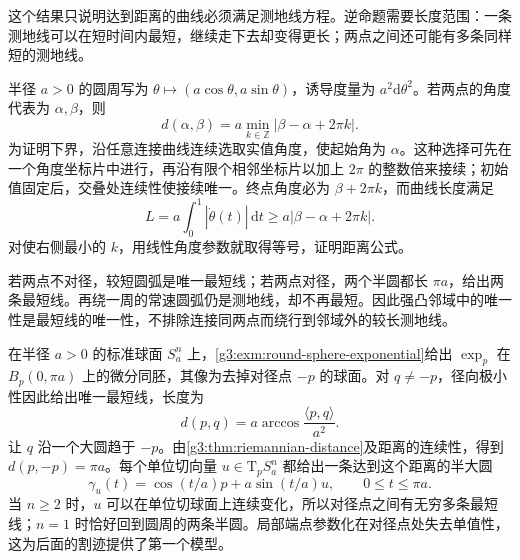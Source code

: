 这个结果只说明达到距离的曲线必须满足测地线方程。逆命题需要长度范围：一条测地线可以在短时间内最短，继续走下去却变得更长；两点之间还可能有多条同样短的测地线。

\begin{example}
	\label{g3:exm:circle-distance}
	半径 \(a>0\) 的圆周写为 \(\theta\mapsto(a\cos\theta,a\sin\theta)\)，诱导度量为 \(a^2\mathrm{d}\theta^2\)。若两点的角度代表为 \(\alpha,\beta\)，则
	\begin{equation}
		\label{g3:eq:circle-distance}
		d(\alpha,\beta)=a\min_{k\in\mathbb Z}|\beta-\alpha+2\pi k|.
	\end{equation}
	为证明下界，沿任意连接曲线连续选取实值角度，使起始角为 \(\alpha\)。这种选择可先在一个角度坐标片中进行，再沿有限个相邻坐标片以加上 \(2\pi\) 的整数倍来接续；初始值固定后，交叠处连续性使接续唯一。终点角度必为 \(\beta+2\pi k\)，而曲线长度满足
	\[
		L=a\int_0^1|\dot\theta(t)|\,\mathrm{d}t
		\geq a|\beta-\alpha+2\pi k|.
	\]
	对使右侧最小的 \(k\)，用线性角度参数就取得等号，证明距离公式。

	若两点不对径，较短圆弧是唯一最短线；若两点对径，两个半圆都长 \(\pi a\)，给出两条最短线。再绕一周的常速圆弧仍是测地线，却不再最短。因此强凸邻域中的唯一性是最短线的唯一性，不排除连接同两点而绕行到邻域外的较长测地线。
\end{example}

\begin{example}
	\label{g3:exm:sphere-multiple-minimizers}
	在半径 \(a>0\) 的标准球面 \(S_a^n\) 上，\cref{g3:exm:round-sphere-exponential}给出 \(\exp_p\) 在 \(B_p(0,\pi a)\) 上的微分同胚，其像为去掉对径点 \(-p\) 的球面。对 \(q\ne-p\)，径向极小性因此给出唯一最短线，长度为
	\[
		d(p,q)=a\arccos\frac{\langle p,q\rangle}{a^2}.
	\]
	让 \(q\) 沿一个大圆趋于 \(-p\)。由\cref{g3:thm:riemannian-distance}及距离的连续性，得到 \(d(p,-p)=\pi a\)。每个单位切向量 \(u\in\mathrm{T}_pS_a^n\) 都给出一条达到这个距离的半大圆
	\[
		\gamma_u(t)=\cos(t/a)p+a\sin(t/a)u,
		\qquad 0\leq t\leq\pi a.
	\]
	当 \(n\geq2\) 时，\(u\) 可以在单位切球面上连续变化，所以对径点之间有无穷多条最短线；\(n=1\) 时恰好回到圆周的两条半圆。局部端点参数化在对径点处失去单值性，这为后面的割迹提供了第一个模型。
\end{example}

